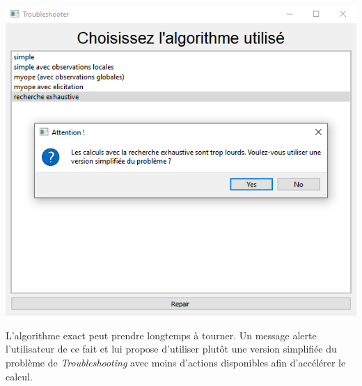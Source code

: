 \documentclass[a4paper,11pt]{article}
\theoremstyle{plain}
\theoremstyle{definition}
\begin{document}
\begin{center}
\includegraphics[scale=0.667]{Figures/exato_popup}
\end{center}
L'algorithme exact peut prendre longtemps à tourner. Un message alerte l'utilisateur de ce fait et lui propose d'utiliser plutôt une version simplifiée du problème de \emph{Troubleshooting} avec moins d'actions disponibles afin d'accélérer le calcul.
\end{document}

